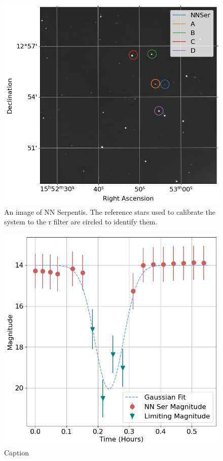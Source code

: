 \documentclass[%
reprint,
amsmath,amssymb,
aps,
]{revtex4-2}
\begin{document}
			\begin{figure}
				\includegraphics[width=\columnwidth]{rBandStars.png}
				\caption{\label{fig:rBandStars} An image of NN Serpentis. The reference stars used to calibrate the system to the r filter are circled to identify them.}
			\end{figure}	
			
			\begin{figure}
				\includegraphics[width=\columnwidth]{lightcurve.png}
				\caption{\label{fig:lightcurve} Caption}
			\end{figure}
\end{document}

